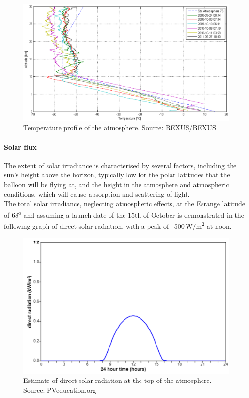 	\begin{figure}[H]
    \centering
    \includegraphics[scale=0.58]{4-experiment-design/img/mechanical/atmosphere.PNG}
	\caption{Temperature profile of the atmosphere. Source: REXUS/BEXUS}
	\label{fig:atmosphere}
	\end{figure}



\paragraph{Solar flux}

The extent of solar irradiance is characterised by several factors, including the sun’s height above the horizon, typically low for the polar latitudes that the balloon will be flying at, and the height in the atmosphere and atmospheric conditions, which will cause absorption and scattering of light. \\
The total solar irradiance, neglecting atmospheric effects, at the Esrange latitude of 68\textsuperscript{o} and assuming a launch date of the 15th of October is demonstrated in the following graph of direct solar radiation, with a peak of ~500\,W/m\textsuperscript{2} at noon.\\

	\begin{figure}[H]
    \centering
    \includegraphics[scale=0.6]{4-experiment-design/img/mechanical/directradiation.png}
	\caption{Estimate of direct solar radiation at the top of the atmosphere. Source: PVeducation.org}
	\label{fig:directradiation}
	\end{figure}

